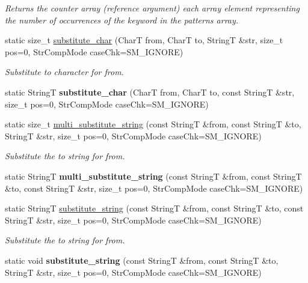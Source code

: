 \begin{CompactItemize}
\begin{CompactList}\small\item\em Returns the counter array (reference argument) each array element representing the number of occurrences of the keyword in the patterns array. \item\end{CompactList}\item 
\hypertarget{classAlgorithm_667249353d6a2af69417b4320f407dcd}{
static size\_\-t \hyperlink{classAlgorithm_667249353d6a2af69417b4320f407dcd}{substitute\_\-char} (CharT from, CharT to, StringT \&str, size\_\-t pos=0, StrCompMode caseChk=SM\_\-IGNORE)}
\label{classAlgorithm_667249353d6a2af69417b4320f407dcd}

\begin{CompactList}\small\item\em Substitute to character for from. \item\end{CompactList}\item 
\hypertarget{classAlgorithm_f35d710c0f73e1e20271697a1898fafc}{
static StringT \textbf{substitute\_\-char} (CharT from, CharT to, const StringT \&str, size\_\-t pos=0, StrCompMode caseChk=SM\_\-IGNORE)}
\label{classAlgorithm_f35d710c0f73e1e20271697a1898fafc}

\item 
static size\_\-t \hyperlink{classAlgorithm_0a6aaf09e6d9d4214b5d6c86938006fb}{multi\_\-substitute\_\-string} (const StringT \&from, const StringT \&to, StringT \&str, size\_\-t pos=0, StrCompMode caseChk=SM\_\-IGNORE)
\begin{CompactList}\small\item\em Substitute the to string for from. \item\end{CompactList}\item 
\hypertarget{classAlgorithm_6044d3ee43757fc67b0cbb91984514b0}{
static StringT \textbf{multi\_\-substitute\_\-string} (const StringT \&from, const StringT \&to, const StringT \&str, size\_\-t pos=0, StrCompMode caseChk=SM\_\-IGNORE)}
\label{classAlgorithm_6044d3ee43757fc67b0cbb91984514b0}

\item 
static StringT \hyperlink{classAlgorithm_658530c0e10cee77d1c94801efc28b1d}{substitute\_\-string} (const StringT \&from, const StringT \&to, const StringT \&str, size\_\-t pos=0, StrCompMode caseChk=SM\_\-IGNORE)
\begin{CompactList}\small\item\em Substitute the to string for from. \item\end{CompactList}\item 
\hypertarget{classAlgorithm_00d9f2c7bb54335f75c048bc2e8fa223}{
static void \textbf{substitute\_\-string} (const StringT \&from, const StringT \&to, StringT \&str, size\_\-t pos=0, StrCompMode caseChk=SM\_\-IGNORE)}
\label{classAlgorithm_00d9f2c7bb54335f75c048bc2e8fa223}


\end{CompactItemize}
